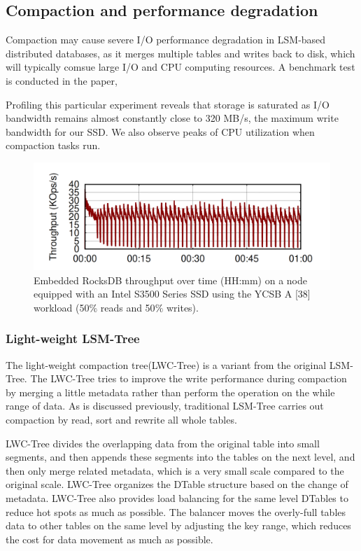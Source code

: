 \documentclass[a4paper,10pt,twoside]{article}
\begin{document}
\subsection{Compaction and performance degradation}
Compaction may cause severe I/O performance degradation in LSM-based distributed databases, 
as it merges multiple tables and writes back to disk, which will typically comsue large I/O and CPU computing resources.
A benchmark test is conducted in the paper\cite{mainpaper}, 
\begin{displayquote}
	Profiling this particular experiment
	reveals that storage is saturated as I/O bandwidth remains
	almost constantly close to 320 MB/s, the maximum write
	bandwidth for our SSD. We also observe peaks of CPU utilization
	when compaction tasks run. 
\end{displayquote}
\begin{figure}[h]
    \centering
	\includegraphics[scale=0.3]{Campaction perf.png}
    \caption{Embedded RocksDB throughput over time (HH:mm) on
	a node equipped with an Intel S3500 Series SSD using the YCSB
	A [38] workload (50$\%$ reads and 50$\%$ writes).}
    \label{fig:mesh1}
\end{figure}

\subsubsection{Light-weight LSM-Tree}
The light-weight compaction tree(LWC-Tree) \cite{Yao2017ALC} is a variant from the original LSM-Tree. 
The LWC-Tree tries to improve the write performance during compaction by merging a little metadata rather than perform the operation on the while range of data.
As is discussed previously, traditional LSM-Tree carries out compaction by read, sort and rewrite all whole tables. 
\par
LWC-Tree divides the overlapping data from the original table into small segments, and then appends these segments into the tables on the next level, 
and then only merge related metadata, which is a very small scale compared to the original scale. 
LWC-Tree organizes the DTable structure based on the change of metadata. 
LWC-Tree also provides load balancing for the same level DTables to reduce hot spots as much as possible. 
The balancer moves the overly-full tables data to other tables on the same level by adjusting the key range, which reduces the cost for data movement as much as possible.
\end{document}
